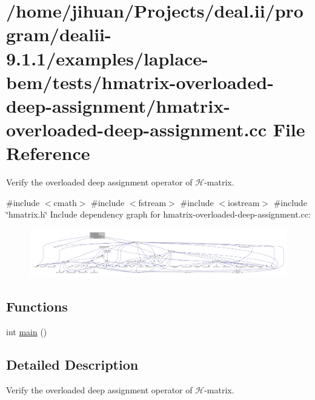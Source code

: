 \hypertarget{hmatrix-overloaded-deep-assignment_8cc}{}\section{/home/jihuan/\+Projects/deal.ii/program/dealii-\/9.1.1/examples/laplace-\/bem/tests/hmatrix-\/overloaded-\/deep-\/assignment/hmatrix-\/overloaded-\/deep-\/assignment.cc File Reference}
\label{hmatrix-overloaded-deep-assignment_8cc}


Verify the overloaded deep assignment operator of $\mathcal{H}$-\/matrix.  


{\ttfamily \#include $<$cmath$>$}\newline
{\ttfamily \#include $<$fstream$>$}\newline
{\ttfamily \#include $<$iostream$>$}\newline
{\ttfamily \#include \char`\"{}hmatrix.\+h\char`\"{}}\newline
Include dependency graph for hmatrix-\/overloaded-\/deep-\/assignment.cc\+:
\nopagebreak
\begin{figure}[H]
\begin{center}
\leavevmode
\includegraphics[width=350pt]{hmatrix-overloaded-deep-assignment_8cc__incl}
\end{center}
\end{figure}
\subsection*{Functions}
\begin{DoxyCompactItemize}
\item 
int \hyperlink{hmatrix-overloaded-deep-assignment_8cc_ae66f6b31b5ad750f1fe042a706a4e3d4}{main} ()
\end{DoxyCompactItemize}


\subsection{Detailed Description}
Verify the overloaded deep assignment operator of $\mathcal{H}$-\/matrix. 

